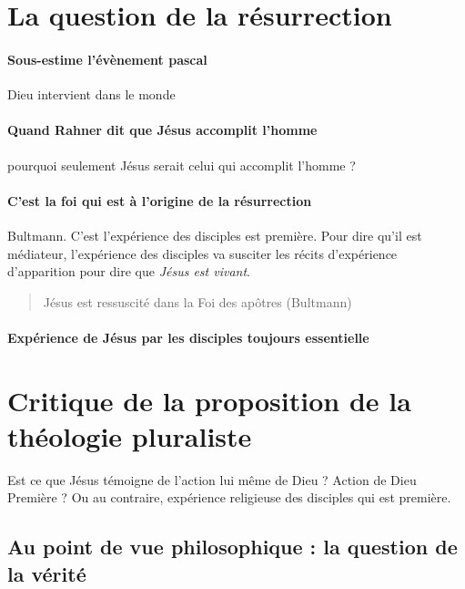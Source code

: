 \section{La question de la résurrection}


 \paragraph{Sous-estime l'évènement pascal} Dieu intervient dans le monde

 \paragraph{Quand Rahner dit que Jésus accomplit l'homme} pourquoi seulement Jésus serait celui qui accomplit l'homme ? 

 \paragraph{C'est la foi qui est à l'origine de la résurrection} Bultmann. C'est l'expérience des disciples est première. Pour dire qu'il est médiateur, l'expérience des disciples va susciter les récits d'expérience d'apparition pour dire que \textit{Jésus est vivant}.

\begin{quote}
  Jésus est ressuscité dans la Foi des apôtres (Bultmann)  
\end{quote}

 \paragraph{Expérience de Jésus par les disciples toujours essentielle}








 
\section{Critique de la proposition de la théologie pluraliste}

\begin{Synthesis}
    Est ce que Jésus témoigne de l'action lui même de Dieu ? Action de Dieu Première ?
    Ou au contraire, expérience religieuse des disciples qui est première.
\end{Synthesis}
 \subsection{Au point de vue philosophique : la question de la vérité}

